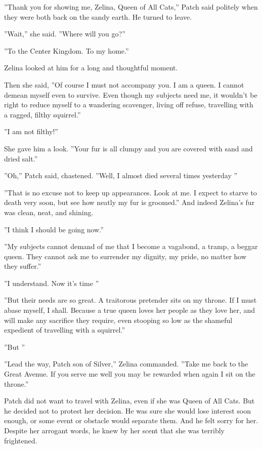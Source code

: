 \documentclass[12pt]{book}
\begin{document}
''Thank you for showing me, Zelina, Queen of All Cats,'' Patch said politely when they were both back on the sandy earth. He turned to leave.

''Wait,'' she said. ''Where will you go?''

''To the Center Kingdom. To my home.''

Zelina looked at him for a long and thoughtful moment.

Then she said, ''Of course I must not accompany you. I am a queen. I cannot demean myself even to survive. Even though my subjects need me, it wouldn't be right to reduce myself to a wandering scavenger, living off refuse, travelling with a ragged, filthy squirrel.''

''I am not filthy!''

She gave him a look. ''Your fur is all clumpy and you are covered with sand and dried salt.''

''Oh,'' Patch said, chastened. ''Well, I almost died several times yesterday %
''

''That is no excuse not to keep up appearances. Look at me. I expect to starve to death very soon, but see how neatly my fur is groomed.'' And indeed Zelina's fur was clean, neat, and shining.

''I think I should be going now.''

''My subjects cannot demand of me that I become a vagabond, a tramp, a beggar queen. They cannot ask me to surrender my dignity, my pride, no matter how they suffer.''

''I understand. Now it's time %
''

''But their needs are so great. A traitorous pretender sits on my throne. If I must abase myself, I shall. Because a true queen loves her people as they love her, and will make any sacrifice they require, even stooping so low as the shameful expedient of travelling with a squirrel.''

''But %
''

''Lead the way, Patch son of Silver,'' Zelina commanded. ''Take me back to the Great Avenue. If you serve me well you may be rewarded when again I sit on the throne.''

Patch did not want to travel with Zelina, even if she was Queen of All Cats. But he decided not to protest her decision. He was sure she would lose interest soon enough, or some event or obstacle would separate them. And he felt sorry for her. Despite her arrogant words, he knew by her scent that she was terribly frightened.
\end{document}
